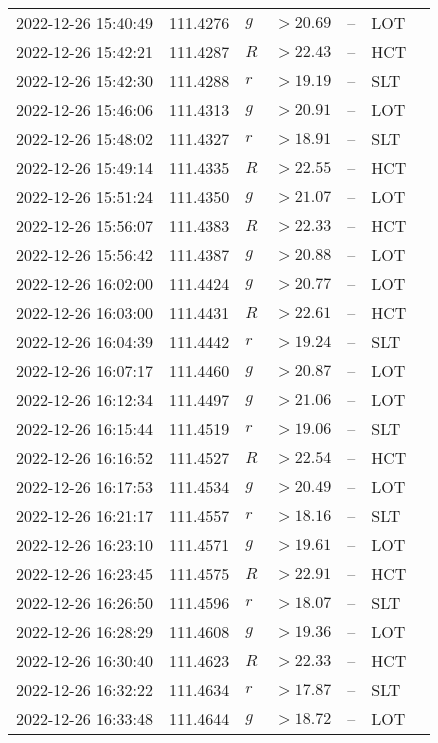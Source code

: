 \documentclass{nature_plusfigure}
\begin{document}
\begin{supplement}
\begin{center}
\begin{longtable}{lllllll}
2022-12-26 15:40:49 & 111.4276 & $g$ & $>20.69$ & -- & LOT &  \\ 
2022-12-26 15:42:21 & 111.4287 & $R$ & $>22.43$ & -- & HCT &  \\ 
2022-12-26 15:42:30 & 111.4288 & $r$ & $>19.19$ & -- & SLT &  \\ 
2022-12-26 15:46:06 & 111.4313 & $g$ & $>20.91$ & -- & LOT &  \\ 
2022-12-26 15:48:02 & 111.4327 & $r$ & $>18.91$ & -- & SLT &  \\ 
2022-12-26 15:49:14 & 111.4335 & $R$ & $>22.55$ & -- & HCT &  \\ 
2022-12-26 15:51:24 & 111.4350 & $g$ & $>21.07$ & -- & LOT &  \\ 
2022-12-26 15:56:07 & 111.4383 & $R$ & $>22.33$ & -- & HCT &  \\ 
2022-12-26 15:56:42 & 111.4387 & $g$ & $>20.88$ & -- & LOT &  \\ 
2022-12-26 16:02:00 & 111.4424 & $g$ & $>20.77$ & -- & LOT &  \\ 
2022-12-26 16:03:00 & 111.4431 & $R$ & $>22.61$ & -- & HCT &  \\ 
2022-12-26 16:04:39 & 111.4442 & $r$ & $>19.24$ & -- & SLT &  \\ 
2022-12-26 16:07:17 & 111.4460 & $g$ & $>20.87$ & -- & LOT &  \\ 
2022-12-26 16:12:34 & 111.4497 & $g$ & $>21.06$ & -- & LOT &  \\ 
2022-12-26 16:15:44 & 111.4519 & $r$ & $>19.06$ & -- & SLT &  \\ 
2022-12-26 16:16:52 & 111.4527 & $R$ & $>22.54$ & -- & HCT &  \\ 
2022-12-26 16:17:53 & 111.4534 & $g$ & $>20.49$ & -- & LOT &  \\ 
2022-12-26 16:21:17 & 111.4557 & $r$ & $>18.16$ & -- & SLT &  \\ 
2022-12-26 16:23:10 & 111.4571 & $g$ & $>19.61$ & -- & LOT &  \\ 
2022-12-26 16:23:45 & 111.4575 & $R$ & $>22.91$ & -- & HCT &  \\ 
2022-12-26 16:26:50 & 111.4596 & $r$ & $>18.07$ & -- & SLT &  \\ 
2022-12-26 16:28:29 & 111.4608 & $g$ & $>19.36$ & -- & LOT &  \\ 
2022-12-26 16:30:40 & 111.4623 & $R$ & $>22.33$ & -- & HCT &  \\ 
2022-12-26 16:32:22 & 111.4634 & $r$ & $>17.87$ & -- & SLT &  \\ 
2022-12-26 16:33:48 & 111.4644 & $g$ & $>18.72$ & -- & LOT &  \\ 

\end{longtable}
\end{center}
\end{supplement}
\end{document}
